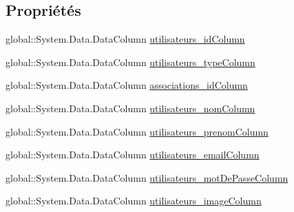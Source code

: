 \subsection*{Propriétés}
\begin{DoxyCompactItemize}
\item 
global\+::\+System.\+Data.\+Data\+Column \hyperlink{classforma_1_1formadb_data_set_1_1utilisateurs_data_table_a603513ff31d210e4635b8e4c6e276560}{utilisateurs\+\_\+id\+Column}
\item 
global\+::\+System.\+Data.\+Data\+Column \hyperlink{classforma_1_1formadb_data_set_1_1utilisateurs_data_table_ada8e6bc4864449792b192c0a04b7fc19}{utilisateurs\+\_\+type\+Column}
\item 
global\+::\+System.\+Data.\+Data\+Column \hyperlink{classforma_1_1formadb_data_set_1_1utilisateurs_data_table_ac05a4c2daf592190934d51ed25df11ff}{associations\+\_\+id\+Column}
\item 
global\+::\+System.\+Data.\+Data\+Column \hyperlink{classforma_1_1formadb_data_set_1_1utilisateurs_data_table_a86a413b1718503e31f92195978902cc4}{utilisateurs\+\_\+nom\+Column}
\item 
global\+::\+System.\+Data.\+Data\+Column \hyperlink{classforma_1_1formadb_data_set_1_1utilisateurs_data_table_a117714396a353a60451d38a544eb89b7}{utilisateurs\+\_\+prenom\+Column}
\item 
global\+::\+System.\+Data.\+Data\+Column \hyperlink{classforma_1_1formadb_data_set_1_1utilisateurs_data_table_a051e8b69868dbf8401d5d12e96c3a5e1}{utilisateurs\+\_\+email\+Column}
\item 
global\+::\+System.\+Data.\+Data\+Column \hyperlink{classforma_1_1formadb_data_set_1_1utilisateurs_data_table_a83c3368a01faae61b183b10a17d0a7a6}{utilisateurs\+\_\+mot\+De\+Passe\+Column}
\item 
global\+::\+System.\+Data.\+Data\+Column \hyperlink{classforma_1_1formadb_data_set_1_1utilisateurs_data_table_a0cfc4c12649f8e9f651622f514a985d4}{utilisateurs\+\_\+image\+Column}

\end{DoxyCompactItemize}
